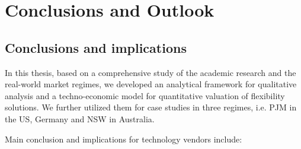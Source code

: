 \chapter{Conclusions and Outlook}
\label{conclusion}
%
\section{Conclusions and implications}

In this thesis, based on a comprehensive study of  the academic research and the real-world market regimes, we developed an analytical framework for qualitative analysis and a techno-economic model for quantitative valuation of flexibility solutions. We further utilized them for case studies in three regimes, i.e. PJM in the US, Germany and NSW in Australia. 

Main conclusion and implications for technology vendors include:


